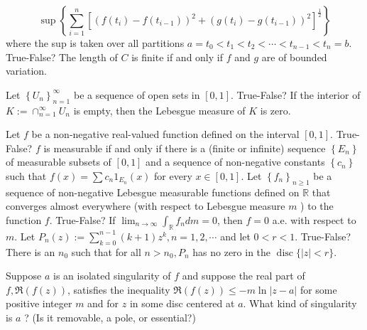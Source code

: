 \documentclass[14pt]{extarticle}
\begin{document}
$$
\sup \left\{\sum_{i=1}^{n}\left[\left(f\left(t_{i}\right)-f\left(t_{i-1}\right)\right)^{2}+\left(g\left(t_{i}\right)-g\left(t_{i-1}\right)\right)^{2}\right]^{\frac{1}{2}}\right\}
$$
where the sup is taken over all partitions $a=t_{0}<t_{1}<t_{2}<\cdots<t_{n-1}<t_{n}=b$. True-False? The length of $C$ is finite if and only if $f$ and $g$ are of bounded variation.
\newpage

Let $\left\{U_{n}\right\}_{n=1}^{\infty}$ be a sequence of open sets in $[0,1]$. True-False? If the interior of $K:=\cap_{n=1}^{\infty} U_{n}$ is empty, then the Lebesgue measure of $K$ is zero.
\newpage

Let $f$ be a non-negative real-valued function defined on the interval $[0,1]$. True-False? $f$ is measurable if and only if there is a (finite or infinite) sequence $\left\{E_{n}\right\}$ of measurable subsets of $[0,1]$ and a sequence of non-negative constants $\left\{c_{n}\right\}$ such that $f(x)=\sum c_{n} 1_{E_{n}}(x)$ for every $x \in[0,1]$.
\newpage
Let $\left\{f_{n}\right\}_{n \geq 1}$ be a sequence of non-negative Lebesgue measurable functions defined on $\mathbb{R}$ that converges almost everywhere (with respect to Lebesgue measure $m$ ) to the function $f$. True-False? If $\lim _{n \rightarrow \infty} \int_{\mathbb{R}} f_{n} d m=0$, then $f=0$ a.e. with respect to $m$.
\newpage
Let $P_{n}(z):=\sum_{k=0}^{n-1}(k+1) z^{k}, n=1,2, \cdots$ and let $0<r<1$. True-False? There is an $n_{0}$ such that for all $n>n_{0}, P_{n}$ has no zero in the $\operatorname{disc}\{|z|<r\}$.

Suppose $a$ is an isolated singularity of $f$ and suppose the real part of $f, \mathfrak{R}(f(z))$, satisfies the inequality $\mathfrak{R}(f(z)) \leq-m \ln |z-a|$ for some positive integer $m$ and for $z$ in some disc centered at $a$. What kind of singularity is $a$ ? (Is it removable, a pole, or essential?)
\newpage
\end{document}
